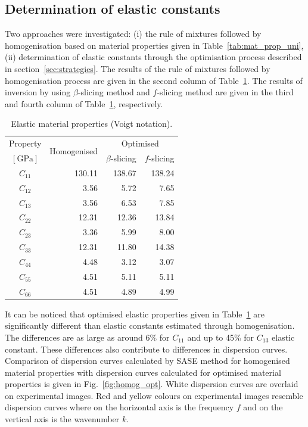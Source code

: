\documentclass[preprint,12pt]{elsarticle}
\begin{document}
\subsection{Determination of elastic constants}
Two approaches were investigated: (i) the rule of mixtures followed by homogenisation based on material properties given in Table~\ref{tab:mat_prop_uni}, (ii) determination of elastic constants through the optimisation process described in section~\ref{sec:strategies}. 
The results of the rule of mixtures followed by homogenisation process are given in the second column of Table~\ref{tab:mat_prop_identified}.
The results of inversion by using $\beta$-slicing method and $f$-slicing method are given in the third and fourth column of Table~\ref{tab:mat_prop_identified}, respectively.
\begin{table}[h]
	\renewcommand{\arraystretch}{1.3}
	\centering \footnotesize
	\caption{Elastic material properties (Voigt notation).}
	\begin{tabular}{crrr} 
		\toprule
		Property & \multirow{2}{*}{Homogenised} & \multicolumn{2}{c}{Optimised}\\
		\cmidrule(lr){3-4}
		$\left[\textrm{GPa}\right]$ &  & $\beta$-slicing & $f$-slicing \\ 
		\midrule 
		$C_{11}$ & 130.11 & 138.67 & 138.24 \\ 
		$C_{12}$ & 3.56   & 5.72   & 7.65\\ 
		$C_{13}$ & 3.56   & 6.53   & 7.85\\
		$C_{22}$ & 12.31  & 12.36  & 13.84\\
		$C_{23}$ & 3.36   & 5.99  & 8.00\\
		$C_{33}$ & 12.31  & 11.80 & 14.38\\
		$C_{44}$ & 4.48   & 3.12  & 3.07\\
		$C_{55}$ & 4.51   & 5.11  & 5.11\\
		$C_{66}$ & 4.51   & 4.89  & 4.99 \\
		\bottomrule
	\end{tabular} 
	\label{tab:mat_prop_identified}
\end{table}
It can be noticed that optimised elastic properties given in Table~\ref{tab:mat_prop_identified} are significantly different than elastic constants estimated through homogenisation. 
The differences are as large as around 6\% for $C_{11}$ and up to 45\% for $C_{13}$ elastic constant.
These differences also contribute to differences in dispersion curves. 
Comparison of dispersion curves calculated by SASE method for homogenised material properties with dispersion curves calculated for optimised material properties is given in Fig.~\ref{fig:homog_opt}. 
White dispersion curves are overlaid on experimental images. 
Red and yellow colours on experimental images resemble dispersion curves where on the horizontal axis is the frequency $f$ and on the vertical axis is the wavenumber $k$. 
\end{document}
